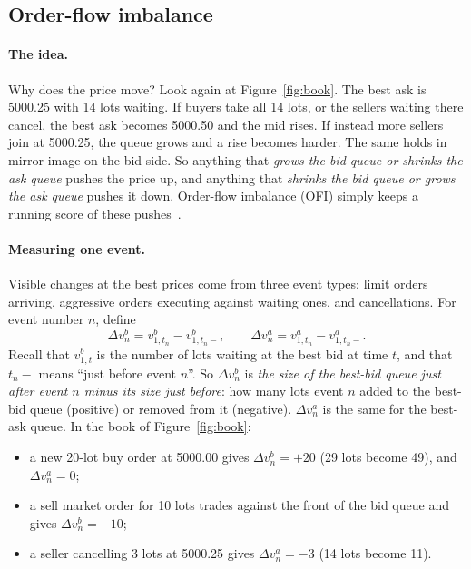 \subsection{Order-flow imbalance}

\paragraph{The idea.} Why does the price move? Look again at Figure~\ref{fig:book}. The best ask
is 5000.25 with 14 lots waiting. If buyers take all 14 lots, or the sellers waiting there cancel,
the best ask becomes 5000.50 and the mid rises. If instead more sellers join at 5000.25, the queue
grows and a rise becomes harder. The same holds in mirror image on the bid side. So anything that
\emph{grows the bid queue or shrinks the ask queue} pushes the price up, and anything that
\emph{shrinks the bid queue or grows the ask queue} pushes it down. Order-flow imbalance (OFI)
simply keeps a running score of these pushes~\citep{cks2014}.

\paragraph{Measuring one event.} Visible changes at the best prices come from three event types:
limit orders arriving, aggressive orders executing against waiting ones, and cancellations. For
event number $n$, define
\[
  \Delta v^{b}_{n} = v^{b}_{1,t_n} - v^{b}_{1,t_n-},
  \qquad
  \Delta v^{a}_{n} = v^{a}_{1,t_n} - v^{a}_{1,t_n-}.
\]
Recall that $v^{b}_{1,t}$ is the number of lots waiting at the best bid at time $t$, and that
$t_n-$ means ``just before event $n$''. So $\Delta v^{b}_{n}$ is \emph{the size of the best-bid
queue just after event $n$ minus its size just before}: how many lots event $n$ added to the
best-bid queue (positive) or removed from it (negative). $\Delta v^{a}_{n}$ is the same for the
best-ask queue. In the book of Figure~\ref{fig:book}:
\begin{itemize}[leftmargin=1.5em,itemsep=1pt]
\item a new 20-lot buy order at 5000.00 gives $\Delta v^b_n = +20$ (29 lots become 49), and
  $\Delta v^a_n = 0$;
\item a sell market order for 10 lots trades against the front of the bid queue and gives
  $\Delta v^b_n = -10$;
\item a seller cancelling 3 lots at 5000.25 gives $\Delta v^a_n = -3$ (14 lots become 11).
\end{itemize}


